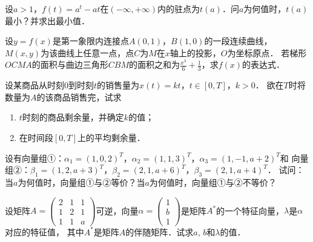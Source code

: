 \documentclass[plain,noanswer,medmath]{../../template/jnuexam}
\begin{document}




\begin{problem}
设$a > 1$，$f(t) = a^t - at$在$(-\infty , +\infty)$内的驻点为$t(a)$．问$a$为何值时，$t(a)$最小？并求出最小值．
\end{problem}



\begin{problem}
设$y = f(x)$是第一象限内连接点$A(0,1)$，$B(1,0)$的一段连续曲线，
$M(x,y)$为该曲线上任意一点，点$C$为$M$在$x$轴上的投影，$O$为坐标原点．
若梯形$OCMA$的面积与曲边三角形$CBM$的面积之和为$\frac{x^3}{6} + \frac{1}{3}$，求$f(x)$的表达式．
\end{problem}



\begin{problem}
设某商品从时刻$0$到时刻$t$的销售量为$x(t) = kt$，$t \in[0,T]$，$k > 0$．
欲在$T$时将数量为$A$的该商品销售完，试求
\begin{enumerate}
\item $t$时刻的商品剩余量，并确定$k$的值；
\item 在时间段$[0,T]$上的平均剩余量．
\end{enumerate}
\end{problem}



\begin{problem}
设有向量组①：$\alpha_1 = (1,0,2)^T$，$\alpha_2 = (1,1,3)^T$，$\alpha_3 = (1, - 1,a + 2)^T$和
向量组②：$\beta_1 = (1,2,a + 3)^T$，$\beta_2 = (2,1,a + 6)^T$，$\beta_3 = (2,1,a + 4)^T$．
试问：当$a$为何值时，向量组①与②等价？当$a$为何值时，向量组①与②不等价？
\end{problem}



\begin{problem}
设矩阵$A = \begin{pmatrix}
  2 & 1 & 1 \\
  1 & 2 & 1 \\
  1 & 1 & a
\end{pmatrix}$可逆，向量$\alpha = \begin{pmatrix}
  1 \\
  b \\
  1
\end{pmatrix}$是矩阵$A^*$的一个特征向量，$\lambda$是$\alpha$对应的特征值，
其中$A^*$是矩阵$A$的伴随矩阵．试求$a$, $b$和$\lambda$的值．
\end{problem}
\end{document}
